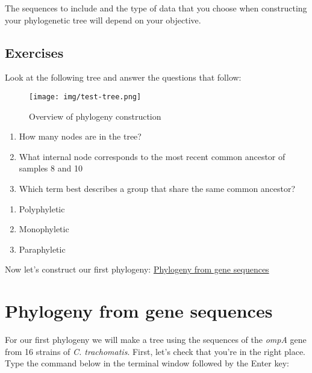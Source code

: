 \documentclass[11pt]{article}
\providecommand{\tightlist}{%
      \setlength{\itemsep}{0pt}\setlength{\parskip}{0pt}}
\begin{document}
The sequences to include and the type of data that you choose when
constructing your phylogenetic tree will depend on your objective.

    \hypertarget{exercises}{%
\subsection{Exercises}\label{exercises}}

Look at the following tree and answer the questions that follow:

    \begin{figure}
\centering
\texttt{[image: img/test-tree.png]}
\caption{Overview of phylogeny construction}
\end{figure}

    \begin{enumerate}
\def\labelenumi{\arabic{enumi}.}
\tightlist
\item
  How many nodes are in the tree?
\item
  What internal node corresponds to the most recent common ancestor of
  samples 8 and 10
\item
  Which term best describes a group that share the same common ancestor?
\end{enumerate}

\begin{enumerate}
\def\labelenumi{\alph{enumi}.}
\tightlist
\item
  Polyphyletic
\item
  Monophyletic
\item
  Paraphyletic
\end{enumerate}

    Now let's construct our first phylogeny: \href{gene.ipynb}{Phylogeny
from gene sequences}





\newpage





    \hypertarget{phylogeny-from-gene-sequences}{%
\section{Phylogeny from gene
sequences}\label{phylogeny-from-gene-sequences}}

For our first phylogeny we will make a tree using the sequences of the
\textit{ompA} gene from 16 strains of \textit{C. trachomatis}. First, let's
check that you're in the right place. Type the command below in the
terminal window followed by the Enter key:
\end{document}
